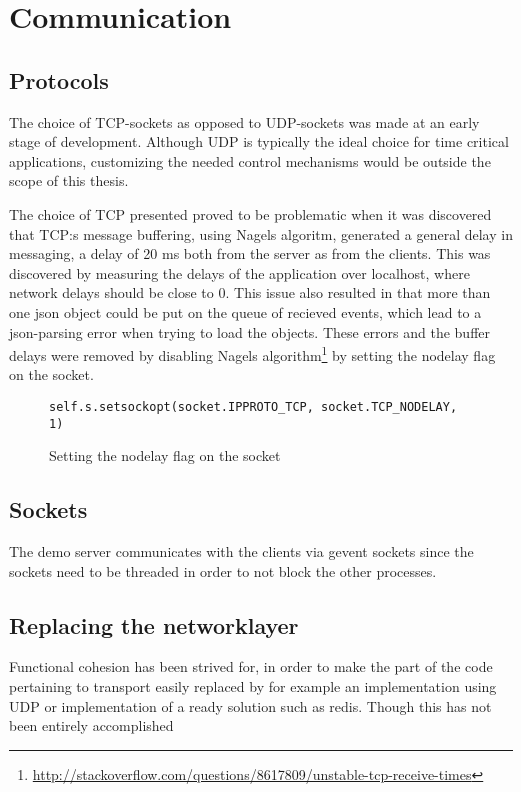 \section{Communication}

\subsection{Protocols}
The choice of TCP-sockets as opposed to UDP-sockets was made at an early stage of development. Although UDP is typically the ideal choice for time critical applications, customizing the needed control mechanisms would be outside the scope of this thesis. 

The choice of TCP presented proved to be problematic when it was discovered that TCP:s message buffering, using Nagels algoritm, generated a general delay in messaging, a delay of 20 ms both from the server as from the clients. This was discovered by measuring the delays of the application over localhost, where network delays should be close to 0. This issue also resulted in that more than one json object could be put on the queue of recieved events, which lead to a json-parsing error when trying to load the objects. These errors and the buffer delays were removed by disabling Nagels algorithm\footnote{\url{http://stackoverflow.com/questions/8617809/unstable-tcp-receive-times}} by setting the nodelay flag on the socket.


\begin{figure}[h!]
\centering
\texttt{self.s.setsockopt(socket.IPPROTO\_TCP, socket.TCP\_NODELAY, 1)}
\caption{Setting the nodelay flag on the socket}
\end{figure}

\subsection{Sockets}
The demo server communicates with the clients via gevent sockets since the sockets need to be threaded in order to not block the other processes. 


\subsection{Replacing the networklayer}
Functional cohesion has been strived for, in order to make the part of the code pertaining to transport easily replaced by for example an implementation using UDP or implementation of a ready solution such as redis. Though this has not been entirely accomplished %




